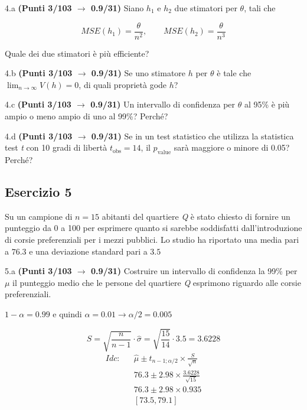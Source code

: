 \documentclass[
  11pt,
]{book}
\theoremstyle{mytheoremstyle}
\theoremstyle{mydefstyle}
\newenvironment{sol}
  {
  \begin{tcolorbox}[enhanced,breakable,arc=0.1mm,boxrule=1pt,colback=white,colframe=iblue,
  title=\bf \fontfamily{lmss}\selectfont \hspace{.5 cm} Soluzione,drop fuzzy shadow]

}{
\end{tcolorbox}
  }
\begin{document}
4.a \textbf{(Punti 3/103 \(\rightarrow\) 0.9/31)} Siano \(h_1\) e \(h_2\) due stimatori per \(\theta\), tali che

\[
MSE(h_1) =  \frac{\theta}{n^2}, \qquad MSE(h_2) =  \frac{\theta}{n^3}
\]

Quale dei due stimatori è più efficiente?

4.b \textbf{(Punti 3/103 \(\rightarrow\) 0.9/31)} Se uno stimatore \(h\) per \(\theta\) è tale che \(\lim_{n\to\infty}V(h)=0\), di quali proprietà gode \(h\)?

4.c \textbf{(Punti 3/103 \(\rightarrow\) 0.9/31)} Un intervallo di confidenza per \(\theta\) al 95\% è più ampio o meno ampio di uno al 99\%? Perché?

4.d \textbf{(Punti 3/103 \(\rightarrow\) 0.9/31)} Se in un test statistico che utilizza la statistica test \emph{t} con 10 gradi di libertà \(t_\text{obs}=14\), il \(p_\text{value}\) sarà maggiore o minore di 0.05? Perché?

\subsection{Esercizio 5}\label{esercizio-5-13}

Su un campione di \(n=15\) abitanti del quartiere \emph{Q} è stato chiesto di fornire un punteggio da 0 a 100 per esprimere quanto si sarebbe soddisfatti dall'introduzione di corsie preferenziali per i mezzi pubblici. Lo studio ha riportato una media pari a \(76.3\) e una deviazione standard pari a \(3.5\)

5.a \textbf{(Punti 3/103 \(\rightarrow\) 0.9/31)} Costruire un intervallo di confidenza la 99\% per \(\mu\) il punteggio medio che le persone del quartiere \emph{Q} esprimono riguardo alle corsie preferenziali.

\begin{sol}
\(1-\alpha =0.99\) e quindi \(\alpha=0.01\rightarrow \alpha/2=0.005\)

\[
      S  =\sqrt{\frac {n}{n-1}}\cdot\hat\sigma =
     \sqrt{\frac { 15 }{ 14 }}\cdot 3.5 = 3.6228 
\]
\begin{eqnarray*}
  Idc: & &  \hat\mu \pm  t_{n-1;\alpha/2} \times \frac{S}{\sqrt{n}} \\
     & &  76.3 \pm  2.98 \times \frac{ 3.6228 }{\sqrt{ 15 }} \\
     & &  76.3 \pm  2.98 \times  0.935 \\
     & & [ 73.5 ,  79.1 ]
\end{eqnarray*}

\end{sol}
\end{document}
